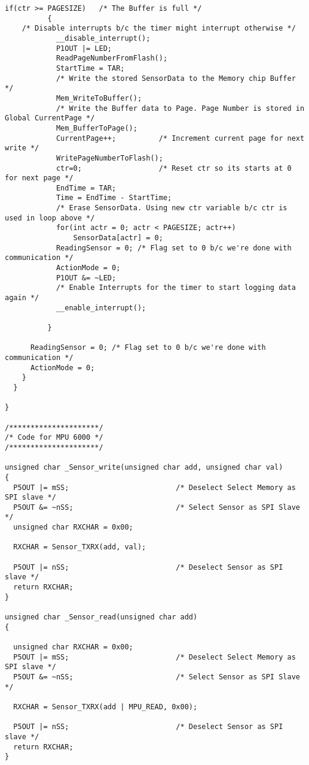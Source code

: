 \begin{lstlisting}[caption=Main.c,label=Code4]
          if(ctr >= PAGESIZE)   /* The Buffer is full */
          {
	/* Disable interrupts b/c the timer might interrupt otherwise */
            __disable_interrupt();	
            P1OUT |= LED;
            ReadPageNumberFromFlash();
            StartTime = TAR;
            /* Write the stored SensorData to the Memory chip Buffer */
            Mem_WriteToBuffer();	
            /* Write the Buffer data to Page. Page Number is stored in Global CurrentPage */
            Mem_BufferToPage();		
            CurrentPage++;			/* Increment current page for next write */
            WritePageNumberToFlash();
            ctr=0;					/* Reset ctr so its starts at 0 for next page */
            EndTime = TAR;
            Time = EndTime - StartTime;
            /* Erase SensorData. Using new ctr variable b/c ctr is used in loop above */
            for(int actr = 0; actr < PAGESIZE; actr++)	
                SensorData[actr] = 0;
            ReadingSensor = 0; /* Flag set to 0 b/c we're done with communication */
            ActionMode = 0;
            P1OUT &= ~LED;
            /* Enable Interrupts for the timer to start logging data again */
            __enable_interrupt();	

          }
      
      ReadingSensor = 0; /* Flag set to 0 b/c we're done with communication */
      ActionMode = 0;
    }
  }
  
}

/*********************/
/* Code for MPU 6000 */
/*********************/

unsigned char _Sensor_write(unsigned char add, unsigned char val)
{
  P5OUT |= mSS;                         /* Deselect Select Memory as SPI slave */  
  P5OUT &= ~nSS;                        /* Select Sensor as SPI Slave */
  unsigned char RXCHAR = 0x00;
  
  RXCHAR = Sensor_TXRX(add, val);
  
  P5OUT |= nSS;                         /* Deselect Sensor as SPI slave */        
  return RXCHAR;
}

unsigned char _Sensor_read(unsigned char add)
{
  
  unsigned char RXCHAR = 0x00;
  P5OUT |= mSS;                         /* Deselect Select Memory as SPI slave */  
  P5OUT &= ~nSS;                        /* Select Sensor as SPI Slave */
  
  RXCHAR = Sensor_TXRX(add | MPU_READ, 0x00);
  
  P5OUT |= nSS;                         /* Deselect Sensor as SPI slave */   
  return RXCHAR;
}


\end{lstlisting}
